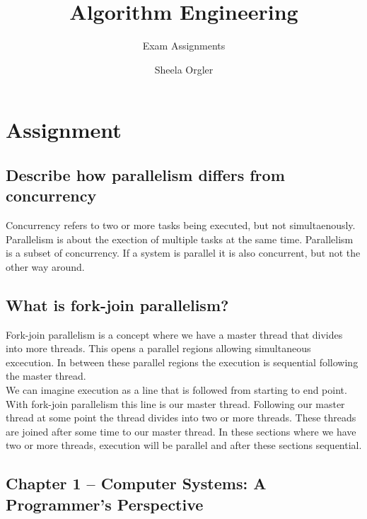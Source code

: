 \documentclass[runningheads]{llncs}
\begin{document}
\title{Algorithm Engineering}
\subtitle{Exam Assignments}


\author{Sheela Orgler}

\maketitle


\section{Assignment}

\subsection{Describe how parallelism differs from concurrency}
Concurrency refers to two or more tasks being executed, but not simultaenously. 
Parallelism is about the exection of multiple tasks at the same time.
Parallelism is a subset of concurrency. If a system is parallel it is also concurrent, but not the other way around.

\subsection{What is fork-join parallelism?}
Fork-join parallelism is a concept where we have a master thread that divides into more threads. 
This opens a parallel regions allowing simultaneous excecution.
In between these parallel regions the execution is sequential following the master thread. 
\\
We can imagine execution as a line that is followed from starting to end point. 
With fork-join parallelism this line is our master thread. 
Following our master thread at some point the thread divides into two or more threads. 
These threads are joined after some time to our master thread. 
In these sections where we have two or more threads, execution will be parallel and after these sections sequential. 


\subsection {Chapter 1 – Computer Systems: A Programmer’s Perspective}
\end{document}
